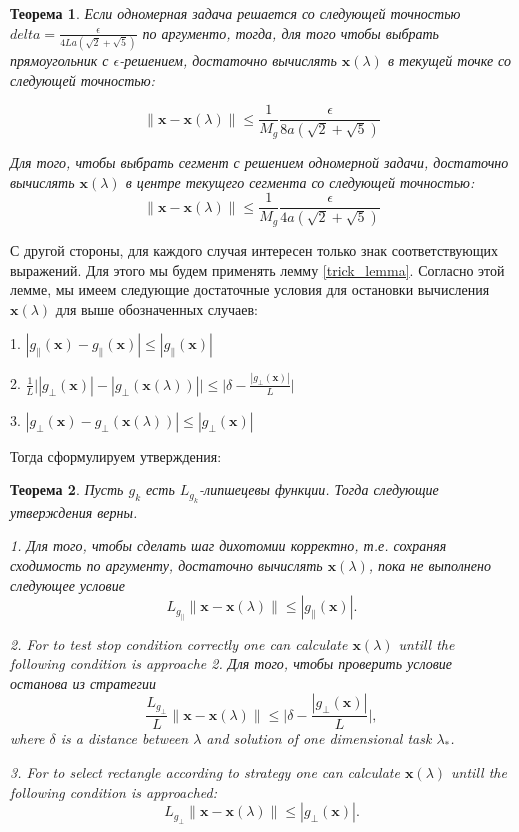 \documentclass[12pt]{article}
\newtheorem{theorem}{Теорема}[section]
\begin{document}
\begin{theorem}
\label{StonPas_Dual}
Если одномерная задача решается со следующей точностью $delta =  \frac{\epsilon}{4La(\sqrt{2}+\sqrt{5})}$ по аргументо, тогда, для того чтобы выбрать прямоугольник с $\epsilon$-решением, достаточно вычислять $\textbf{x}(\lambda)$ в текущей точке со следующей точностью:

\begin{equation}
\|\textbf{x} - \textbf{x}(\lambda)\| \leq \frac{1}{M_g}\frac{\epsilon}{8a(\sqrt{2}+\sqrt{5})}
\end{equation}

Для того, чтобы выбрать сегмент с решением одномерной задачи, достаточно вычислять $\textbf{x}(\lambda)$ в центре текущего сегмента со следующей точностью:
\begin{equation}
\|\textbf{x} - \textbf{x}(\lambda)\| \leq \frac{1}{M_g}\frac{\epsilon}{4a(\sqrt{2}+\sqrt{5})}
\end{equation}
\end{theorem}

С другой стороны, для каждого случая интересен только знак соответствующих выражений. Для этого мы будем применять  лемму \ref{trick_lemma}. Согласно этой лемме, мы имеем следующие достаточные условия для остановки вычисления $\textbf{x}(\lambda)$ для выше обозначенных случаев:

1. $|g_\parallel(\textbf{x})-g_\parallel(\textbf{x})|\leq |g_\parallel(\textbf{x})|$

2. $\frac{1}{L}\Big||g_\perp(\textbf{x})|-|g_\perp(\textbf{x}(\lambda))|\Big|\leq \Big|\delta-\frac{|g_\perp(\textbf{x})|}{L}\Big|$

3. $|g_\perp(\textbf{x})-g_\perp(\textbf{x}(\lambda))|\leq |g_\perp(\textbf{x})|$

Тогда сформулируем утверждения:

\begin{theorem}\label{x_lambda}
Пусть $g_k$ есть $L_{g_k}$-липшецевы функции. Тогда следующие утверждения верны.

1. Для того, чтобы сделать шаг дихотомии корректно, т.е. сохраняя сходимость по аргументу, достаточно вычислять $\textbf{x}(\lambda)$, пока не выполнено следующее условие
$$L_{g_\parallel}\|\textbf{x}-\textbf{x}(\lambda)\|\leq |g_\parallel(\textbf{x})|.$$

2. For to test stop condition correctly one can calculate $\textbf{x}(\lambda)$ untill the following condition is approache
2. Для того, чтобы проверить условие останова из стратегии 
$$\frac{L_{g_\perp}}{L}\|\textbf{x}-\textbf{x}(\lambda)\|\leq\Big|\delta-\frac{|g_\perp(\textbf{x})|}{L}\Big|,$$
where $\delta$ is a distance between $\lambda$ and solution of one dimensional task $\lambda_*$.

3. For to select rectangle according to strategy one can calculate $\textbf{x}(\lambda)$ untill the following condition is approached:
$$L_{g_\perp}\|\textbf{x}-\textbf{x}(\lambda)\|\leq |g_\perp(\textbf{x})|.$$
\end{theorem}
\end{document}
